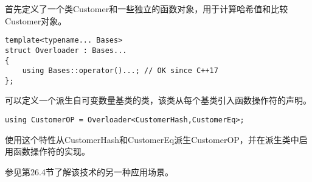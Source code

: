 首先定义了一个类Customer和一些独立的函数对象，用于计算哈希值和比较Customer对象。

\begin{lstlisting}[style=styleCXX]
template<typename... Bases>
struct Overloader : Bases...
{
	using Bases::operator()...; // OK since C++17
};
\end{lstlisting}

可以定义一个派生自可变数量基类的类，该类从每个基类引入函数操作符的声明。

\begin{lstlisting}[style=styleCXX]
using CustomerOP = Overloader<CustomerHash,CustomerEq>;
\end{lstlisting}

使用这个特性从CustomerHash和CustomerEq派生CustomerOP，并在派生类中启用函数操作符的实现。

参见第26.4节了解该技术的另一种应用场景。


























